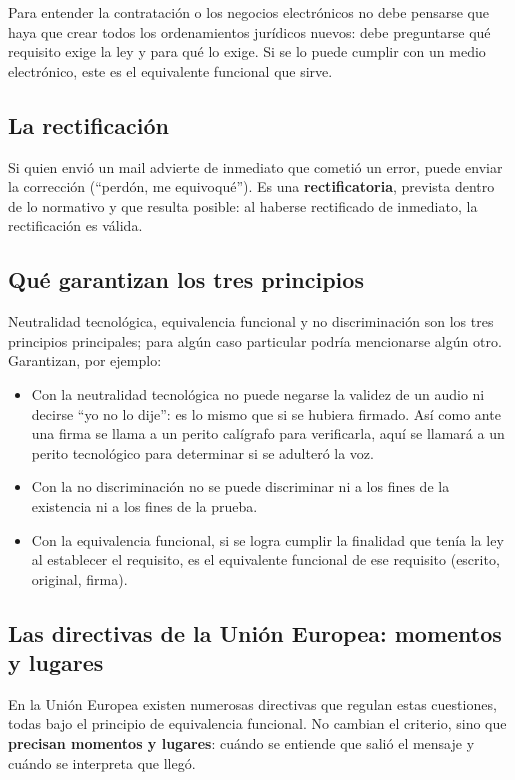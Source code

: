 \documentclass[12pt,oneside]{book}
\begin{document}
Para entender la contratación o los negocios electrónicos no debe pensarse que haya que crear todos los ordenamientos jurídicos nuevos: debe preguntarse qué requisito exige la ley y para qué lo exige. Si se lo puede cumplir con un medio electrónico, este es el equivalente funcional que sirve.

\subsection{La rectificación}

Si quien envió un mail advierte de inmediato que cometió un error, puede enviar la corrección (``perdón, me equivoqué''). Es una \textbf{rectificatoria}, prevista dentro de lo normativo y que resulta posible: al haberse rectificado de inmediato, la rectificación es válida.

\subsection{Qué garantizan los tres principios}

Neutralidad tecnológica, equivalencia funcional y no discriminación son los tres principios principales; para algún caso particular podría mencionarse algún otro. Garantizan, por ejemplo:

\begin{itemize}
    \item Con la neutralidad tecnológica no puede negarse la validez de un audio ni decirse ``yo no lo dije'': es lo mismo que si se hubiera firmado. Así como ante una firma se llama a un perito calígrafo para verificarla, aquí se llamará a un perito tecnológico para determinar si se adulteró la voz.
    \item Con la no discriminación no se puede discriminar ni a los fines de la existencia ni a los fines de la prueba.
    \item Con la equivalencia funcional, si se logra cumplir la finalidad que tenía la ley al establecer el requisito, es el equivalente funcional de ese requisito (escrito, original, firma).
\end{itemize}

\subsection{Las directivas de la Unión Europea: momentos y lugares}

En la Unión Europea existen numerosas directivas que regulan estas cuestiones, todas bajo el principio de equivalencia funcional. No cambian el criterio, sino que \textbf{precisan momentos y lugares}: cuándo se entiende que salió el mensaje y cuándo se interpreta que llegó.
\end{document}
